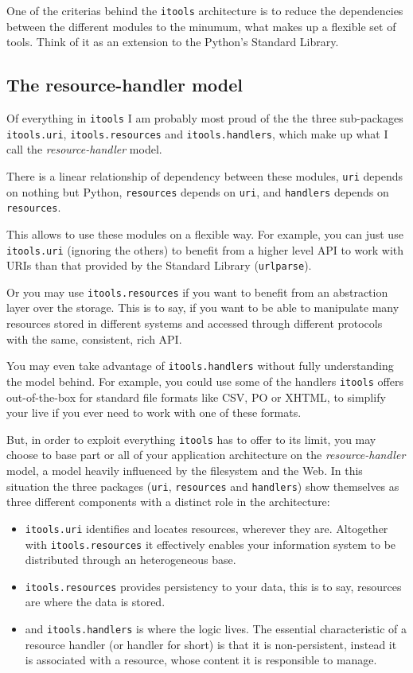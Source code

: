 One of the criterias behind the {\tt itools} architecture is to reduce the
dependencies between the different modules to the minumum, what makes up a
flexible set of tools. Think of it as an extension to the Python's Standard
Library.


\subsection{The resource-handler model}

Of everything in {\tt itools} I am probably most proud of the the three
sub-packages {\tt itools.uri}, {\tt itools.resources} and
{\tt itools.handlers}, which make up what I call the {\em resource-handler}
model.

There is a linear relationship of dependency between these modules, {\tt uri}
depends on nothing but Python, {\tt resources} depends on {\tt uri}, and
{\tt handlers} depends on {\tt resources}.

This allows to use these modules on a flexible way. For example, you can
just use {\tt itools.uri} (ignoring the others) to benefit from a higher
level API to work with URIs than that provided by the Standard Library
({\tt urlparse}).

Or you may use {\tt itools.resources} if you want to benefit from an
abstraction layer over the storage. This is to say, if you want to be able
to manipulate many resources stored in different systems and accessed
through different protocols with the same, consistent, rich API.

You may even take advantage of {\tt itools.handlers} without fully
understanding the model behind. For example, you could use some of the
handlers {\tt itools} offers out-of-the-box for standard file formats
like CSV, PO or XHTML, to simplify your live if you ever need to work
with one of these formats.

But, in order to exploit everything {\tt itools} has to offer to its limit,
you may choose to base part or all of your application architecture on the
{\em resource-handler} model, a model heavily influenced by the filesystem
and the Web. In this situation the three packages ({\tt uri}, {\tt resources}
and {\tt handlers}) show themselves as three different components with
a distinct role in the architecture:

\begin{itemize}
  \item {\tt itools.uri} identifies and locates resources, wherever they
    are. Altogether with {\tt itools.resources} it effectively enables your
    information system to be distributed through an heterogeneous base.

  \item {\tt itools.resources} provides persistency to your data, this is
    to say, resources are where the data is stored.

  \item and {\tt itools.handlers} is where the logic lives. The essential
    characteristic of a resource handler (or handler for short) is that it is
    non-persistent, instead it is associated with a resource, whose content
    it is responsible to manage.
\end{itemize}


